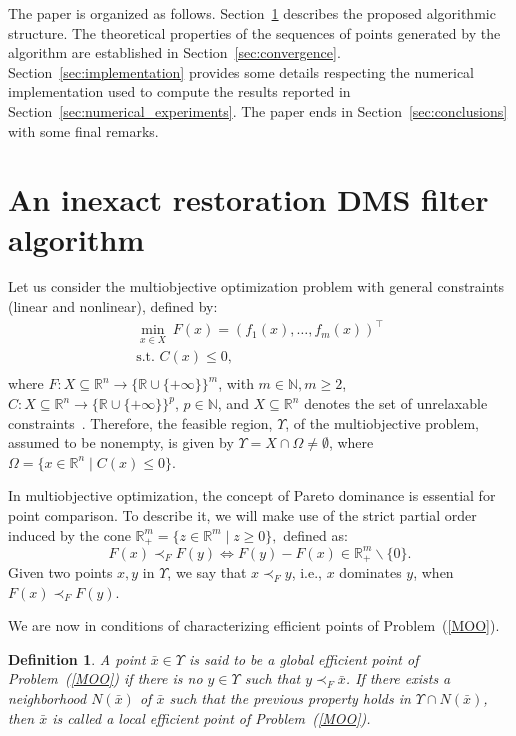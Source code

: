 \documentclass[12pt]{article}
\newtheorem{definition}[theorem]{Definition}
\newcommand{\set}[1]{\{#1\}}
\begin{document}
The paper is organized as follows. Section~\ref{sec:algorithm}
describes the proposed algorithmic structure. The theoretical
properties of the sequences of points generated by the algorithm
are established in Section~\ref{sec:convergence}.
Section~\ref{sec:implementation} provides some details respecting
the numerical implementation used to compute the results reported
in Section~\ref{sec:numerical_experiments}. The paper ends in
Section~\ref{sec:conclusions} with some final remarks.

\section{An inexact restoration DMS filter algorithm}
\label{sec:algorithm}

Let us consider the multiobjective optimization problem with
general constraints (linear and nonlinear), defined by:
\begin{equation}
\begin{array}{l}
\displaystyle \min_{x\in X}\  F(x)=(f_{1}(x),\ldots ,f_{m}(x))^\top \\
\text{s.t. } C(x)\leq 0,\\
\end{array}
\label{MOO}
\end{equation}
where
$F:X\subseteq\mathbb{R}^{n}\to\set{\mathbb{R}\cup\{+\infty\}}^m$,
with $m\in \mathbb{N},m\geq 2$,
$C:X\subseteq\mathbb{R}^n\to\set{\mathbb{R}\cup\set{+\infty}}^p$,
$p\in\mathbb{N}$, and $X\subseteq\mathbb{R}^n$ denotes the set of
unrelaxable constraints~\cite{conn2009}. Therefore, the feasible
region, $\Upsilon$, of the multiobjective problem, assumed to be
nonempty, is given by $\Upsilon =X\cap \Omega\neq \emptyset$,
where $\Omega=\set{x\in \mathbb{R}^{n}\mid C(x)\leq 0}$.

In multiobjective optimization, the concept of Pareto dominance is
essential for point comparison. To describe it, we will make use
of the strict partial order induced by the cone
$\mathbb{R}^m_+=\set{z\in\mathbb{R}^m\mid z\geq 0},$ defined as:
$$F(x)\prec_F F(y) \Leftrightarrow
F(y)-F(x)\in\mathbb{R}_+^m\backslash \set{0}.$$ Given two points
$x,y$ in $\Upsilon$, we say that $x\prec_F y$, i.e., $x$ dominates
$y$, when $F(x)\prec_F F(y)$.

We are now in conditions of characterizing efficient points of
Problem~(\ref{MOO}).
\begin{definition}
A point $\bar{x}\in\Upsilon$ is said to be a global efficient
point of Problem~(\ref{MOO}) if there is no $y\in \Upsilon$ such
that $y\prec_F \bar{x}$. If there exists a neighborhood
$N(\bar{x})$ of $\bar{x}$ such that the previous property holds in
$\Upsilon \cap N(\bar{x})$, then $\bar{x}$ is called a local
efficient point of Problem~(\ref{MOO}).
\end{definition}
\end{document}
